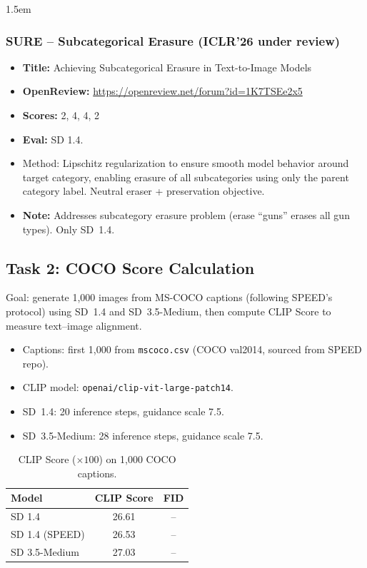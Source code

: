 \documentclass[11pt,a4paper]{article}
\begin{document}
\begin{adjustwidth}{1.5em}{}
\subsubsection{SURE -- Subcategorical Erasure (ICLR'26 under review)}

\begin{itemize}
  \item \textbf{Title:} Achieving Subcategorical Erasure in Text-to-Image Models
  \item \textbf{OpenReview:} \url{https://openreview.net/forum?id=1K7TSEe2x5}
  \item \textbf{Scores:} 2, 4, 4, 2
  \item \textbf{Eval:} SD 1.4.
  \item Method: Lipschitz regularization to ensure smooth model behavior around target category, enabling erasure of all subcategories using only the parent category label. Neutral eraser + preservation objective.
  \item \textbf{Note:} Addresses subcategory erasure problem (erase ``guns'' erases all gun types). Only SD~1.4.
\end{itemize}

\end{adjustwidth}


\subsection{Task 2: COCO Score Calculation}

Goal: generate 1,000 images from MS-COCO captions (following SPEED's protocol) using SD~1.4 and SD~3.5-Medium, then compute CLIP Score to measure text--image alignment.

\begin{itemize}
  \item Captions: first 1,000 from \texttt{mscoco.csv} (COCO val2014, sourced from SPEED repo).
  \item CLIP model: \texttt{openai/clip-vit-large-patch14}.
  \item SD~1.4: 20 inference steps, guidance scale 7.5.
  \item SD~3.5-Medium: 28 inference steps, guidance scale 7.5.
\end{itemize}

\begin{table}[H]
\centering
\caption{CLIP Score ($\times 100$) on 1,000 COCO captions.}
\begin{tabular}{lcc}
\toprule
\textbf{Model} & \textbf{CLIP Score} & \textbf{FID} \\
\midrule
SD 1.4         & 26.61 & -- \\
SD 1.4 (SPEED) & 26.53 & -- \\
SD 3.5-Medium  & 27.03 & -- \\
\bottomrule
\end{tabular}
\label{tab:coco_clip}
\end{table}
\end{document}
